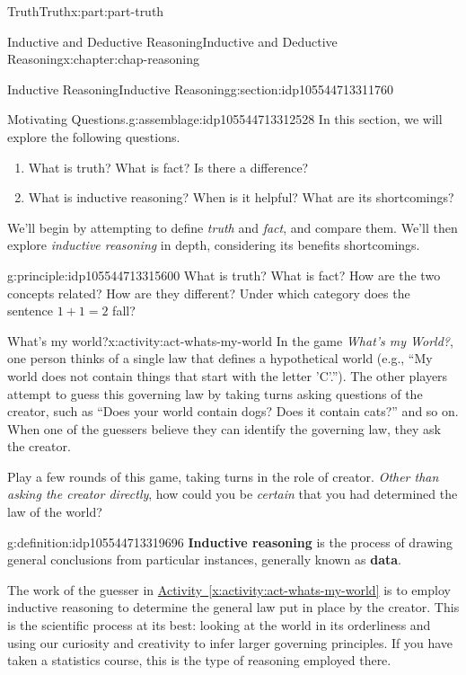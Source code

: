 \documentclass[oneside,10pt,]{book}
\newcommand{\xreffont}{\relax}
\newcommand{\terminology}[1]{\textbf{#1}}
\numberwithin{equation}{section}
\begin{document}
\begin{partptx}{Truth}{}{Truth}{}{}{x:part:part-truth}
\begin{chapterptx}{Inductive and Deductive Reasoning}{}{Inductive and Deductive Reasoning}{}{}{x:chapter:chap-reasoning}
\begin{sectionptx}{Inductive Reasoning}{}{Inductive Reasoning}{}{}{g:section:idp105544713311760}
\begin{assemblage}{Motivating Questions.}{g:assemblage:idp105544713312528}%
In this section, we will explore the following questions. %
\begin{enumerate}
\item{}What is truth? What is fact? Is there a difference?%
\item{}What is inductive reasoning? When is it helpful? What are its shortcomings?%
\end{enumerate}
%
\end{assemblage}
We'll begin by attempting to define \emph{truth} and \emph{fact}, and compare them. We'll then explore \emph{inductive reasoning} in depth, considering its benefits shortcomings.%
\begin{principle}{}{}{g:principle:idp105544713315600}%
What is truth? What is fact? How are the two concepts related? How are they different? Under which category does the sentence \(1+1=2\) fall?%
\end{principle}
\begin{activity}{What's my world?}{x:activity:act-whats-my-world}%
In the game \emph{What's my World?}, one person thinks of a single law that defines a hypothetical world (e.g., ``My world does not contain things that start with the letter 'C'.''). The other players attempt to guess this governing law by taking turns asking questions of the creator, such as ``Does your world contain dogs? Does it contain cats?'' and so on. When one of the guessers believe they can identify the governing law, they ask the creator.%
\par
Play a few rounds of this game, taking turns in the role of creator. \emph{Other than asking the creator directly}, how could you be \emph{certain} that you had determined the law of the world?%
\end{activity}%
\begin{definition}{}{g:definition:idp105544713319696}%
%
\terminology{Inductive reasoning} is the process of drawing general conclusions from particular instances, generally known as \terminology{data}.%
\end{definition}
The work of the guesser in \hyperref[x:activity:act-whats-my-world]{Activity~{\xreffont\ref{x:activity:act-whats-my-world}}} is to employ inductive reasoning to determine the general law put in place by the creator. This is the scientific process at its best: looking at the world in its orderliness and using our curiosity and creativity to infer larger governing principles. If you have taken a statistics course, this is the type of reasoning employed there.%

\end{sectionptx}
\end{chapterptx}
\end{partptx}
\end{document}
